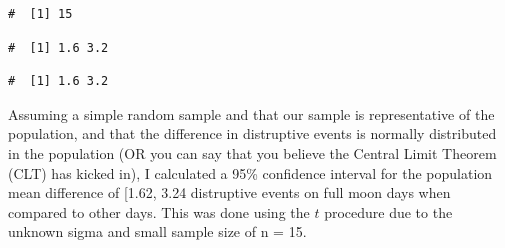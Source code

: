 \documentclass[letterpaper,11pt,twoside,]{pinp}
\begin{document}
\begin{ShadedResult}
\begin{verbatim}
#  [1] 15
\end{verbatim}
\end{ShadedResult}

\begin{Shaded}
\begin{Highlighting}[]
\NormalTok{(}\NormalTok{(}\NormalTok{, }\NormalTok{), }\SpecialCharTok{{-}} \NormalTok{, }\SpecialCharTok{/}
\end{Highlighting}
\end{Shaded}

\begin{ShadedResult}
\begin{verbatim}
#  [1] 1.6 3.2
\end{verbatim}
\end{ShadedResult}

\begin{Shaded}
\begin{Highlighting}[]
\SpecialCharTok{+} \NormalTok{(} \NormalTok{(}\NormalTok{, }\NormalTok{), }\SpecialCharTok{{-}} \NormalTok{) }\SpecialCharTok{*}\SpecialCharTok{/}
\end{Highlighting}
\end{Shaded}

\begin{ShadedResult}
\begin{verbatim}
#  [1] 1.6 3.2
\end{verbatim}
\end{ShadedResult}

Assuming a simple random sample and that our sample is representative of
the population, and that the difference in distruptive events is
normally distributed in the population (OR you can say that you believe
the Central Limit Theorem (CLT) has kicked in), I calculated a 95\%
confidence interval for the population mean difference of {[}1.62, 3.24
distruptive events on full moon days when compared to other days. This
was done using the \(t\) procedure due to the unknown sigma and small
sample size of n = 15.
\end{document}
